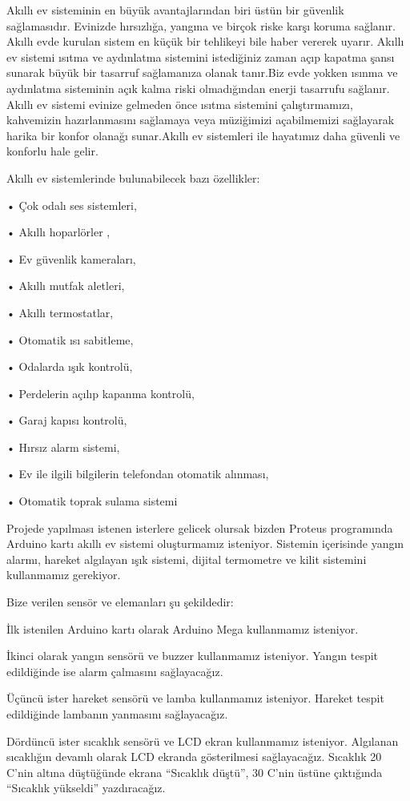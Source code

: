 \documentclass[conference]{IEEEtran}
\begin{document}
Akıllı ev sisteminin en büyük avantajlarından biri üstün bir güvenlik sağlamasıdır. Evinizde hırsızlığa, yangına ve birçok riske karşı koruma sağlanır. Akıllı evde kurulan sistem en küçük bir tehlikeyi bile haber vererek uyarır. Akıllı ev sistemi ısıtma ve aydınlatma sistemini istediğiniz zaman açıp kapatma şansı sunarak büyük bir tasarruf sağlamanıza olanak tanır.Biz evde yokken ısınma ve aydınlatma sisteminin açık kalma riski olmadığından enerji tasarrufu sağlanır. Akıllı ev sistemi evinize gelmeden önce ısıtma sistemini çalıştırmamızı, kahvemizin hazırlanmasını sağlamaya veya müziğimizi açabilmemizi sağlayarak harika bir konfor olanağı sunar.Akıllı ev sistemleri ile hayatımız daha güvenli ve konforlu hale gelir. 

Akıllı ev sistemlerinde bulunabilecek bazı özellikler:

• Çok odalı ses sistemleri,

• Akıllı hoparlörler ,

• Ev güvenlik kameraları,

• Akıllı mutfak aletleri,

• Akıllı termostatlar,

• Otomatik ısı sabitleme,

• Odalarda ışık kontrolü,

• Perdelerin açılıp kapanma kontrolü,

• Garaj kapısı kontrolü,

• Hırsız alarm sistemi,

• Ev ile ilgili bilgilerin telefondan otomatik alınması,

• Otomatik toprak sulama sistemi

Projede yapılması istenen isterlere gelicek olursak bizden Proteus programında Arduino kartı akıllı ev sistemi oluşturmamız isteniyor. Sistemin içerisinde yangın alarmı, hareket algılayan ışık sistemi, dijital termometre ve kilit sistemini kullanmamız gerekiyor.

Bize verilen sensör ve elemanları şu şekildedir:

İlk istenilen Arduino kartı olarak Arduino Mega kullanmamız isteniyor.

İkinci olarak yangın sensörü ve buzzer kullanmamız isteniyor. Yangın tespit edildiğinde ise alarm çalmasını sağlayacağız.

Üçüncü ister hareket sensörü ve lamba kullanmamız isteniyor. Hareket tespit edildiğinde lambanın yanmasını sağlayacağız.

Dördüncü ister sıcaklık sensörü ve LCD ekran kullanmamız isteniyor. Algılanan sıcaklığın devamlı olarak LCD ekranda gösterilmesi sağlayacağız. Sıcaklık 20 C’nin altına düştüğünde ekrana “Sıcaklık düştü”, 30 C’nin üstüne çıktığında “Sıcaklık yükseldi” yazdıracağız.
\end{document}
